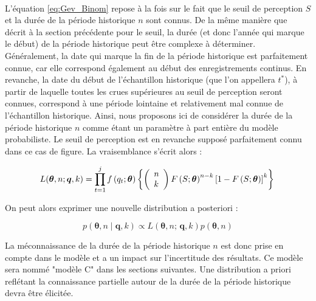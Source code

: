 \documentclass[11pt]{article}
\begin{document}
		\paragraph{}
		L'équation \ref{eq:Gev_Binom} repose à la fois sur le fait que le seuil de perception $S$ et la durée de la période historique $n$ sont connus. De la même manière que décrit à la section précédente pour le seuil, la durée (et donc l'année qui marque le début) de la période historique peut être complexe à déterminer. Généralement, la date qui marque la fin de la période historique est parfaitement connue, car elle correspond également au début des enregistrements continus. En revanche, la date du début de l'échantillon historique (que l'on appellera $t^{*}$), à partir de laquelle toutes les crues supérieures au seuil de perception seront connues, correspond à une période lointaine et relativement mal connue de l'échantillon historique. Ainsi, nous proposons ici de considérer la durée de la période historique $n$ comme étant un paramètre à part entière du modèle probabiliste. Le seuil de perception est en revanche supposé parfaitement connu dans ce cas de figure. La vraisemblance s'écrit alors : 
		 
				\begin{equation}
				L(\boldsymbol{\theta}, n ; \boldsymbol{q}, k) = \prod_{t=1}^j f\left(q_t;\boldsymbol{\theta}\right) \left\{\left(\begin{array}{l}
				n \\
				k
				\end{array}\right) F\left(S;\boldsymbol{\theta}\right)^{n-k}\left[1-F\left(S;\boldsymbol{\theta}\right)\right]^k\right\} \\
				\label{eq:Gev_Binom_uN}
				\end{equation}
				
		On peut alors exprimer une nouvelle distribution a posteriori :
		
				\begin{equation}
					p(\boldsymbol{\theta}, n \mid \boldsymbol{q},k) \propto L(\boldsymbol{\theta},n;\,\boldsymbol{q},k) p(\boldsymbol{\theta},n)
					\label{eq:Bayes_uN}
				\end{equation}
			
		La méconnaissance de la durée de la période historique $n$ est donc prise en compte dans le modèle et a un impact sur l'incertitude des résultats. Ce modèle sera nommé "modèle C" dans les sections suivantes. Une distribution a priori reflétant la connaissance partielle autour de la durée de la période historique devra être élicitée. 
	
\end{document}
